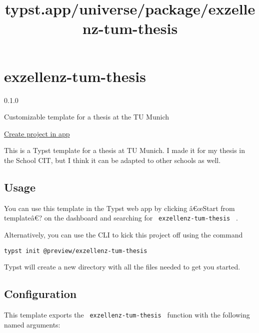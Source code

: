 \title{typst.app/universe/package/exzellenz-tum-thesis}

\label{banner}
\label{template-thumbnail}

\section{exzellenz-tum-thesis}\label{exzellenz-tum-thesis}

{ 0.1.0 }

Customizable template for a thesis at the TU Munich

\href{/app?template=exzellenz-tum-thesis&version=0.1.0}{Create project
in app}

\label{readme}
This is a Typst template for a thesis at TU Munich. I made it for my
thesis in the School CIT, but I think it can be adapted to other schools
as well.

\subsection{Usage}\label{usage}

You can use this template in the Typst web app by clicking â€œStart from
templateâ€? on the dashboard and searching for
\texttt{\ exzellenz-tum-thesis\ } .

Alternatively, you can use the CLI to kick this project off using the
command

\begin{verbatim}
typst init @preview/exzellenz-tum-thesis
\end{verbatim}

Typst will create a new directory with all the files needed to get you
started.

\subsection{Configuration}\label{configuration}

This template exports the \texttt{\ exzellenz-tum-thesis\ } function
with the following named arguments:

